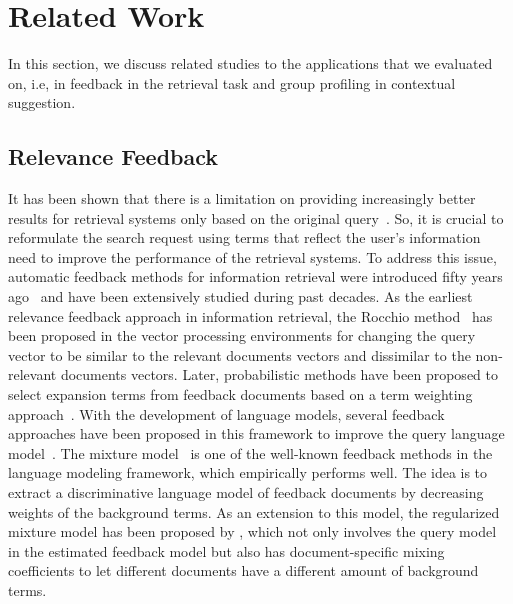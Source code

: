 \section{Related Work}
In this section, we discuss related studies to the applications that we evaluated \acswlm on, i.e, in feedback in the retrieval task and group profiling in contextual suggestion. 

\subsection{Relevance Feedback}
It has been shown that there is a limitation on providing increasingly better results for retrieval systems only based on the original query~\citep{Rijsbergen:1986}. So, it is crucial to reformulate the search request using terms that reflect the user's information need to improve the performance of the retrieval systems. 
To address this issue, automatic feedback methods for information retrieval were introduced fifty years ago~\citep{Rocchio:1971} and have been extensively studied  during past decades.
As the earliest relevance feedback approach in information retrieval, the Rocchio method~\citep{Rocchio:1971} has been proposed in the vector processing environments for changing the query vector to be similar to the relevant documents vectors and dissimilar to the non-relevant documents vectors. 
Later, probabilistic methods have been proposed to select expansion terms from feedback documents based on a term weighting approach~\citep{Robertson:1976,Rijsbergen:1981}. With the development of language models, several feedback approaches have been proposed in this framework to improve the query language model~\citep{Zhai:SMM:2001,Tao:2006,Lavrenko:2001,Hiemstra:2004,Lv:2014}. 
The mixture model~\citep{Zhai:SMM:2001} is one of the well-known feedback methods in the language modeling framework, which empirically performs well. The idea is to extract a discriminative language model of feedback documents by decreasing weights of the background terms. 
As an extension to this model, the regularized mixture model has been proposed by \citet{Tao:2006}, which not only involves the query model in the estimated feedback model but also has document-specific mixing coefficients to let different documents have a different amount of background terms.

